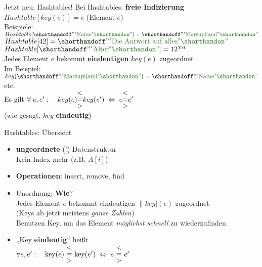 \begin{frame}{Jetzt neu: Hashtables!}  %
	\Impl Bei Hashtables: \textbf{freie Indizierung} \\ 
	$Hashtable[key(e)] = e$ \quad (Element $e$) \\
	Beispiele: \\
	$Hashtable[\str{Name}] = \str{Marsupilami}$ \\
	$Hashtable[42] = \str{Die Antwort auf alles}$ \\
	$Hashtable[\str{Alter}] = 12\TM$ \\
	\pause \forcenewline
	\impl Jedes Element $e$ bekommt \textbf{eindeutigen} $key(e)$ zugeordnet \\
	Im Beispiel: \\
	$key(\str{Marsupilami}) = \str{Name}$ \quad etc.
	\pause \\ \forcenewline
	Es gilt
	$\forall\; e, e': \quad key(e) \stackedtight{< \\ = \\ >} key(e') \gdw e \stackedtight{< \\ = \\ >} e'$ \\ (wie gesagt, $key$ \textbf{eindeutig})
\end{frame}
\fi


\def\key{\|key|}

\begin{frame}{Hashtables: Übersicht} 
	\begin{itemize} 
			\item \textbf{ungeordnete} (!) Datenstruktur \\
			\impl Kein Index mehr (z.B. $A[i]$) 
			\pause
			\item \textbf{Operationen}: insert, remove, find
			\forcenewline \pause
			\item Unordnung: \textbf{Wie}? \\
				\§{\impl} Jedes Element $e$ bekommt eindeutigen $\key(e)$ zugeordnet \\ 
				\. {\small (Keys ab jetzt meistens \textit{ganze Zahlen})} \\
			\impl Benutzen Key, um das Element \emph{möglichst schnell} zu wiederzufinden
			\pause
			\item „Key \textbf{eindeutig}“ heißt \\
			$\forall e, e': \quad \key(e) \ \stackedtight{< \\ = \\ >}\ \key(e') \gdw e \ \stackedtight{< \\ = \\ >} \ e'$ \\
	\end{itemize} 
\end{frame}

